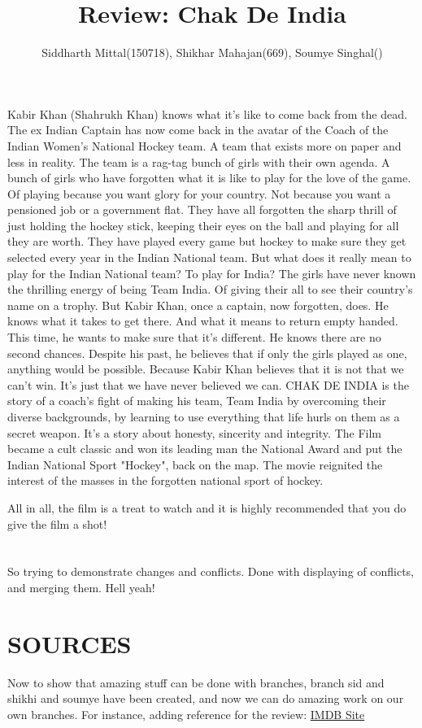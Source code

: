 \documentclass[titlepage]{article}
\title{Review: Chak De India}
\author{Siddharth Mittal(150718), Shikhar Mahajan(669), Soumye Singhal()}
\begin{document}
\maketitle

\section*{}
Kabir Khan (Shahrukh Khan) knows what it's like to come back from the dead. The ex Indian Captain has now come back in the avatar of the Coach of the Indian Women's National Hockey team. A team that exists more on paper and less in reality. The team is a rag-tag bunch of girls with their own agenda. A bunch of girls who have forgotten what it is like to play for the love of the game. Of playing because you want glory for your country. Not because you want a pensioned job or a government flat. They have all forgotten the sharp thrill of just holding the hockey stick, keeping their eyes on the ball and playing for all they are worth. They have played every game but hockey to make sure they get selected every year in the Indian National team. But what does it really mean to play for the Indian National team? To play for India? The girls have never known the thrilling energy of being Team India. Of giving their all to see their country's name on a trophy. But Kabir Khan, once a captain, now forgotten, does. He knows what it takes to get there. And what it means to return empty handed. This time, he wants to make sure that it's different. He knows there are no second chances. Despite his past, he believes that if only the girls played as one, anything would be possible. Because Kabir Khan believes that it is not that we can't win. It's just that we have never believed we can. CHAK DE INDIA is the story of a coach's fight of making his team, Team India by overcoming their diverse backgrounds, by learning to use everything that life hurls on them as a secret weapon. It's a story about honesty, sincerity and integrity. The Film became a cult classic and won its leading man the National Award and put the Indian National Sport "Hockey", back on the map. The movie reignited the interest of the masses in the forgotten national sport of hockey. 

All in all, the film is a treat to watch and it is highly recommended that you do give the film a shot!
\section*{}
So trying to demonstrate changes and conflicts.
Done with displaying of conflicts, and merging them. Hell yeah!

\section*{SOURCES}
Now to show that amazing stuff can be done with branches, branch sid and shikhi and soumye have been created, and now we can do amazing work on our own branches.
For instance, adding reference for the review: \href{http://www.imdb.com/title/tt0871510/plotsummary}{IMDB Site}
\end{document}
